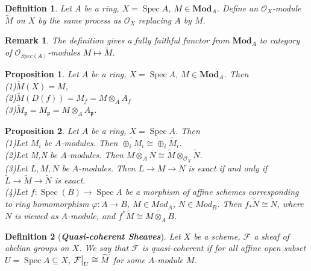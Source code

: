 \documentclass{ctexart}
\newtheorem{definition}{Definition}[section]
\newtheorem{remark}{Remark}[section]
\newtheorem{proposition}{Proposition}[section]
\newcommand{\spec}{\operatorname{Spec}}
\newcommand{\module}{\mathbf{Mod}}
\begin{document}
\begin{definition}
    Let $A$ be a ring, $X = \spec A$, $M\in \module_{A}$.
    Define an $\mathcal{O}_{X}$-module $\widetilde{M}$ on $X$ by the same process as $\mathcal{O}_{X}$ replacing $A$ by $M$.
\end{definition}
\begin{remark}
    The definition gives a fully faithful functor from $\module_{A}$ to category of $\mathcal{O}_{Spec(A)}$-modules $M \longmapsto \widetilde{M}$.
\end{remark}
\begin{proposition}
    Let $A$ be a ring, $X = \spec A$, $M\in \module_{A}$.
    Then \\
    (1)$\widetilde{M}(X) = M$, \\
    (2)$\widetilde{M}(D(f)) = M_{f} = M \otimes_{A} A_{f}$ \\
    (3)$\widetilde{M}_{\mathfrak{p}} = M_{\mathfrak{p}} = M \otimes_{A} A_{\mathfrak{p}}$.
    \label{Proposition 6.1}
\end{proposition}
\begin{proposition}
    Let $A$ be a ring, $X = \spec A$.
    Then \\
    (1)Let $M_{i}$ be $A$-modules. 
    Then $\widetilde{\oplus_{i} M_{i}} \cong \oplus_{i} \widetilde{M_{i}}$. \\
    (2)Let M,N be $A$-modules.
    Then $\widetilde{M \otimes_{A} N} \cong \widetilde{M} \otimes_{\mathcal{O}_{X}} \widetilde{N}$. \\
    (3)Let $L,M,N$ be $A$-modules.
    Then $L \longrightarrow M \longrightarrow N$ is exact if and only if $\widetilde{L} \longrightarrow \widetilde{M} \longrightarrow \widetilde{N}$ is exact. \\
    (4)Let $f: \spec(B) \longrightarrow \spec A$ be a morphism of affine schemes corresponding to ring homomorphism $\varphi: A \longrightarrow B$, $M\in Mod_{A}$, $N\in Mod_{B}$.
    Then $f_{\ast}\widetilde{N} \cong \widetilde{N}$, where $N$ is viewed as $A$-module, and $f^{\ast}\widetilde{M} \cong \widetilde{M \otimes_{A} B}$.
    \label{Proposition 6.2}
\end{proposition}
\begin{definition}[\textbf{\emph{Quasi-coherent Sheaves}}]
    Let $X$ be a scheme, $\mathcal{F}$ a sheaf of abelian groups on $X$.
    We say that $\mathcal{F}$ is quasi-coherent if for all affine open subset $U = \spec A \subseteq X$,
    $\mathcal{F}\big{|}_{U} \cong \widetilde{M}$ for some $A$-module $M$.
\end{definition}
\end{document}
